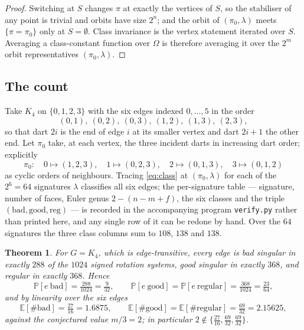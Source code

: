 \documentclass[11pt]{amsart}
\newtheorem{theorem}{Theorem}
\begin{document}
\begin{proof}
Switching at $S$ changes $\pi$ at exactly the vertices of $S$, so the
stabiliser of any point is trivial and orbits have size $2^{n}$; and the orbit
of $(\pi_0,\lambda)$ meets $\{\pi=\pi_0\}$ only at $S=\emptyset$. Class
invariance is the vertex statement iterated over $S$. Averaging a
class-constant function over $\Omega$ is therefore averaging it over the $2^m$
orbit representatives $(\pi_0,\lambda)$.
\end{proof}

\subsection*{The count}
Take $K_4$ on $\{0,1,2,3\}$ with the six edges indexed $0,\dots,5$ in the
order
\[
 (0,1),\ (0,2),\ (0,3),\ (1,2),\ (1,3),\ (2,3),
\]
so that dart $2i$ is the end of edge $i$ at its smaller vertex and dart $2i+1$
the other end. Let $\pi_0$ take, at each vertex, the three incident darts in
increasing dart order; explicitly
\[
 \pi_0: \quad 0\mapsto(1,2,3),\quad 1\mapsto(0,2,3),\quad
 2\mapsto(0,1,3),\quad 3\mapsto(0,1,2)
\]
as cyclic orders of neighbours. Tracing \eqref{eq:class} at $(\pi_0,\lambda)$
for each of the $2^{6}=64$ signatures $\lambda$ classifies all six edges; the
per-signature table --- signature, number of faces, Euler genus $2-(n-m+f)$,
the six classes and the triple $(\text{bad},\text{good},\text{reg})$ --- is
recorded in the accompanying program \texttt{verify.py} rather than printed
here, and any single row of it can be redone by hand. Over the $64$ signatures
the three class columns sum to $108$, $138$ and $138$.


\begin{theorem}\label{thm:k4}
For $G=K_4$, which is edge-transitive, every edge is bad singular in exactly
$288$ of the $1024$ signed rotation systems, good singular in exactly $368$,
and regular in exactly $368$. Hence
\[
 \mathbb{P}[e\ \mathrm{bad}]=\tfrac{288}{1024}=\tfrac{9}{32},\qquad
 \mathbb{P}[e\ \mathrm{good}]=\mathbb{P}[e\ \mathrm{regular}]
 =\tfrac{368}{1024}=\tfrac{23}{64},
\]
and by linearity over the six edges
\[
 \mathbb{E}[\#\mathrm{bad}]=\tfrac{27}{16}=1.6875,\qquad
 \mathbb{E}[\#\mathrm{good}]=\mathbb{E}[\#\mathrm{regular}]
 =\tfrac{69}{32}=2.15625,
\]
against the conjectured value $m/3=2$; in particular
$2\notin\{\tfrac{27}{16},\tfrac{69}{32},\tfrac{69}{32}\}$.
\end{theorem}
\end{document}
